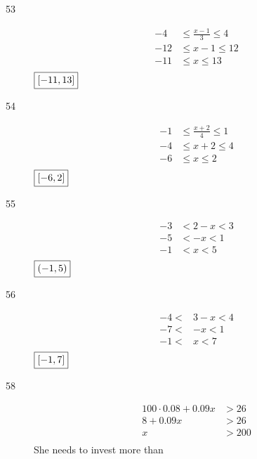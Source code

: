 \documentclass[letterpaper, landscape]{exam}
\begin{document}
\begin{description}
      \newpage

      \item[53]
        \begin{align*}
          -4  & \leq \frac{x - 1}{3} \leq 4 \\
          -12 & \leq x - 1           \leq 12 \\
          -11 & \leq x               \leq 13 \\
        \end{align*}
        $\boxed{ \intcc{ -11, 13 } }$

      \item[54]
        \begin{align*}
          -1 & \leq \frac{x + 2}{4} \leq 1 \\
          -4 & \leq x + 2 \leq 4 \\
          -6 & \leq x \leq 2 \\
        \end{align*}
        $\boxed{ \intcc{ -6, 2 } }$

      \item[55]
        \begin{align*}
          -3 & < 2 - x < 3 \\
          -5 & < - x < 1 \\
          -1 & < x < 5 \\
        \end{align*}
        $\boxed{ \intoo{ -1, 5 } }$

      \item[56]
        \begin{align*}
          -4 < & 3 - x < 4 \\
          -7 < & -x    < 1 \\
          -1 < & x     < 7 \\
        \end{align*}
        $\boxed{ \intcc{ -1, 7 } }$

      \item[58]
        \begin{align*}
          100 \cdot 0.08 + 0.09x & > 26 \\
          8 + 0.09x              & > 26 \\
          x                      & > 200 \\
        \end{align*}
        She needs to invest more than 


\end{description}
\end{document}
